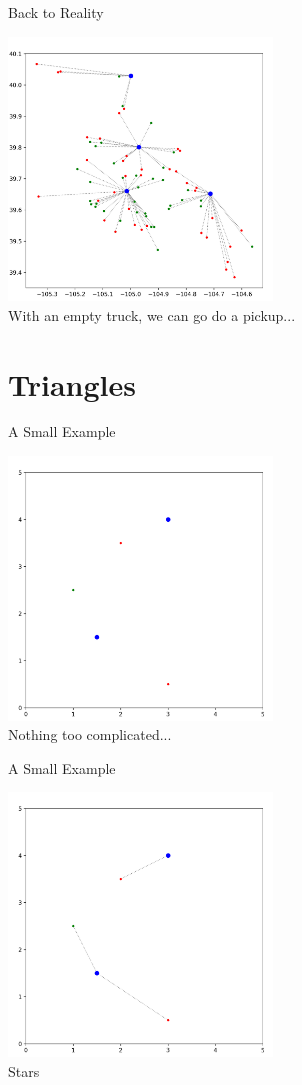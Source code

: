 \documentclass{beamer}
\begin{document}
\begin{frame}{Back to Reality}
	\begin{center}
	\includegraphics[width=7cm]{stars.png}\\
	With an empty truck, we can go do a pickup...
	\end{center}
\end{frame}

\section{Triangles}
\begin{frame}{A Small Example}
	\begin{center}
	\includegraphics[width=7cm]{small_ex_empty.png}\\
	Nothing too complicated...
	\end{center}
\end{frame}

\begin{frame}{A Small Example}
	\begin{center}
	\includegraphics[width=7cm]{small_ex_star.png}\\
	Stars
	\end{center}
\end{frame}
\end{document}
